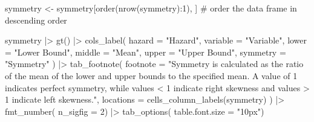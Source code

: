 \documentclass[
  letterpaper,
  DIV=11,
  numbers=noendperiod]{scrartcl}
\newenvironment{Shaded}{\begin{snugshade}}{\end{snugshade}}
\newcommand{\AttributeTok}[1]{\textcolor[rgb]{0.40,0.45,0.13}{#1}}
\newcommand{\CommentTok}[1]{\textcolor[rgb]{0.37,0.37,0.37}{#1}}
\newcommand{\DecValTok}[1]{\textcolor[rgb]{0.68,0.00,0.00}{#1}}
\newcommand{\FunctionTok}[1]{\textcolor[rgb]{0.28,0.35,0.67}{#1}}
\newcommand{\NormalTok}[1]{\textcolor[rgb]{0.00,0.23,0.31}{#1}}
\newcommand{\OtherTok}[1]{\textcolor[rgb]{0.00,0.23,0.31}{#1}}
\newcommand{\SpecialCharTok}[1]{\textcolor[rgb]{0.37,0.37,0.37}{#1}}
\newcommand{\StringTok}[1]{\textcolor[rgb]{0.13,0.47,0.30}{#1}}
\begin{document}
\begin{Shaded}
\begin{Highlighting}[]
\NormalTok{symmetry }\OtherTok{\textless{}{-}}\NormalTok{ symmetry[}\FunctionTok{order}\NormalTok{(}\FunctionTok{nrow}\NormalTok{(symmetry)}\SpecialCharTok{:}\DecValTok{1}\NormalTok{),  ] }\CommentTok{\# order the data frame in descending order}

\NormalTok{symmetry }\SpecialCharTok{|\textgreater{}}
\FunctionTok{gt}\NormalTok{() }\SpecialCharTok{|\textgreater{}} 
  \FunctionTok{cols\_label}\NormalTok{(}
    \AttributeTok{hazard =} \StringTok{"Hazard"}\NormalTok{, }
    \AttributeTok{variable =} \StringTok{"Variable"}\NormalTok{, }
    \AttributeTok{lower =} \StringTok{"Lower Bound"}\NormalTok{, }
    \AttributeTok{middle =} \StringTok{"Mean"}\NormalTok{, }
    \AttributeTok{upper =} \StringTok{"Upper Bound"}\NormalTok{, }
    \AttributeTok{symmetry =} \StringTok{"Symmetry"}
\NormalTok{  ) }\SpecialCharTok{|\textgreater{}}
  \FunctionTok{tab\_footnote}\NormalTok{(}
    \AttributeTok{footnote =} \StringTok{"Symmetry is calculated as the ratio of the mean of the lower and upper bounds to the specified mean. A value of 1 indicates perfect symmetry, while values \textless{} 1 indicate right skewness and values \textgreater{} 1 indicate left skewness."}\NormalTok{,}
    \AttributeTok{locations =} \FunctionTok{cells\_column\_labels}\NormalTok{(symmetry)}
\NormalTok{  ) }\SpecialCharTok{|\textgreater{}}
 \FunctionTok{fmt\_number}\NormalTok{(}
 \AttributeTok{n\_sigfig =} \DecValTok{2}\NormalTok{) }\SpecialCharTok{|\textgreater{}} 
  \FunctionTok{tab\_options}\NormalTok{(}
    \AttributeTok{table.font.size =} \StringTok{"10px"}\NormalTok{)}
\end{Highlighting}
\end{Shaded}
\end{document}
